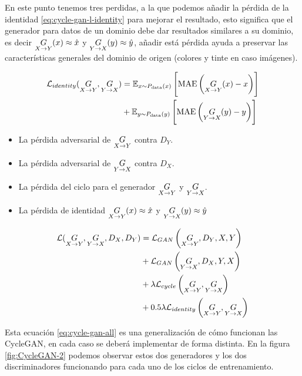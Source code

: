 En este punto tenemos tres perdidas, a la que podemos añadir la pérdida de la identidad \ref{eq:cycle-gan-l-identity} para mejorar el resultado, esto significa que el generador para datos de un dominio debe dar resultados similares a su dominio, es decir ${\underset{X\rightarrow{}Y}{G}(x) \approx \hat{x}}$ y ${\underset{Y\rightarrow{}X}{G}(y) \approx \hat{y}}$, añadir está pérdida ayuda a preservar las características generales del dominio de origen (colores y tinte en caso imágenes).

\begin{equation}
    \begin{split}
        \mathcal{L}_{identity} (\underset{X\rightarrow{}Y}{G},\underset{Y\rightarrow{}X}{G})
        & = \mathbb{E}_{x\sim{}P_{\text{data}}(x)} \left[{\mathrm{MAE}\left(\underset{X\rightarrow{}Y}{G}(x) - x\right)}\right] \\
        & + \mathbb{E}_{y\sim{}P_{\text{data}}(y)} \left[{\mathrm{MAE}\left(\underset{Y\rightarrow{}X}{G}(y) - y\right)}\right] \\
    \end{split}
    \label{eq:cycle-gan-l-identity}
\end{equation}

\begin{itemize}
    \item La pérdida adversarial de ${\underset{X\rightarrow{}Y}{G}}$ contra ${D_{Y}}$.
    \item La pérdida adversarial de ${\underset{Y\rightarrow{}X}{G}}$ contra ${D_{X}}$.
    \item La pérdida del ciclo para el generador ${\underset{X\rightarrow{}Y}{G}}$ y ${\underset{Y\rightarrow{}X}{G}}$.
    \item La pérdida de identidad ${\underset{X\rightarrow{}Y}{G}(x) \approx \hat{x}}$ y ${\underset{Y\rightarrow{}X}{G}(y) \approx \hat{y}}$
\end{itemize}

\begin{equation}
    \begin{split}
        \mathcal{L} (\underset{X\rightarrow{}Y}{G}, \underset{Y\rightarrow{}X}{G}, D_{X}, D_{Y})
        & =            \mathcal{L}_{GAN}       \left(\underset{X\rightarrow{}Y}{G}, D_{Y}, X, Y \right) \\
        & +            \mathcal{L}_{GAN}       \left(\underset{Y\rightarrow{}X}{G}, D_{X}, Y, X \right) \\
        & + \lambda    \mathcal{L}_{cycle}     \left(\underset{X\rightarrow{}Y}{G},\underset{Y\rightarrow{}X}{G}     \right) \\
        & + 0.5\lambda \mathcal{L}_{identity}  \left(\underset{X\rightarrow{}Y}{G},\underset{Y\rightarrow{}X}{G}     \right)
    \end{split}
    \label{eq:cycle-gan-all}
\end{equation}

Esta ecuación \ref{eq:cycle-gan-all} es una generalización de cómo funcionan las \gls{CycleGAN}, en cada caso se deberá implementar de forma distinta. En la figura \ref{fig:CycleGAN-2} podemos observar estos dos generadores y los dos discriminadores funcionando para cada uno de los ciclos de entrenamiento.

